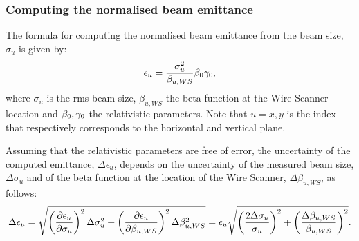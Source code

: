 \subsubsection*{Computing the normalised beam emittance}
The formula for computing the normalised beam emittance from the beam size, $\sigma_u$ is given by:
\begin{equation}\label{eq:emittance_from_WS}
   \centering
   \epsilon_u = \frac{\sigma_u^2}{\beta_{u, WS}} \betarel \gammarel ,
\end{equation}
where $\sigma_u$ is the rms beam size, $\beta_{u, WS}$ the beta function at the Wire Scanner location and ${\beta_0}, {\gamma_0}$ the relativistic parameters. Note that $u=x,y$ is the index that respectively corresponds to the horizontal and vertical plane.

Assuming that the relativistic parameters are free of error, the uncertainty of the computed emittance, $\Delta \epsilon_u$, depends on the uncertainty of the measured beam size, $\Delta \sigma_u$ and of the beta function at the location of the Wire Scanner, $\Delta \beta_{u, WS}$, as follows:
\begin{equation}\label{eq:emittance_from_WS_uncertainty}
   \centering
   \Delta \epsilon_u = \sqrt{\left ( \frac{\partial \epsilon_u}{\partial \sigma_u}\right )^2 \Delta \sigma_u^2 + \left ( \frac{\partial \epsilon_u}{\partial \beta_{u, WS}} \right )^2 \Delta \beta_{u, WS}^2} = \epsilon_u  \sqrt{\left ( \frac{2 \Delta \sigma_u}{\sigma_u}\right )^2 + \left ( \frac{ \Delta \beta_{u, WS}}{\beta_{u, WS}} \right )^2} .
\end{equation}

